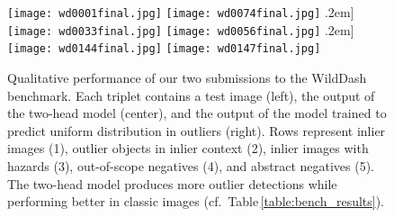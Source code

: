\documentclass[runningheads]{llncs}
\begin{document}
\newcommand{\mylen}{0.49\textwidth}
\begin{figure}[htb]
  \centering
  \texttt{[image: wd0001final.jpg]}
  \hfill
  \texttt{[image: wd0074final.jpg]}
  \0.2em]
  \texttt{[image: wd0033final.jpg]}
  \hfill
  \texttt{[image: wd0056final.jpg]}
  \0.2em]
  \texttt{[image: wd0144final.jpg]}
  \hfill
  \texttt{[image: wd0147final.jpg]}
  \caption{Qualitative performance 
  of our two submissions 
  to the WildDash benchmark. 
  Each triplet contains 
  a test image (left),
  the output of the two-head model (center), 
  and the output of the model trained 
  to predict uniform distribution in outliers (right).
  Rows represent inlier images (1),
  outlier objects in inlier context (2), 
  inlier images with hazards (3),
  out-of-scope negatives (4),
  and abstract negatives (5).
  The two-head model produces 
  more outlier detections
  while performing better 
  in classic images 
  (cf.~Table\,\ref{table:bench_results}).
  }
  \label{fig:bench_bin_oe}
\end{figure}
\end{document}
